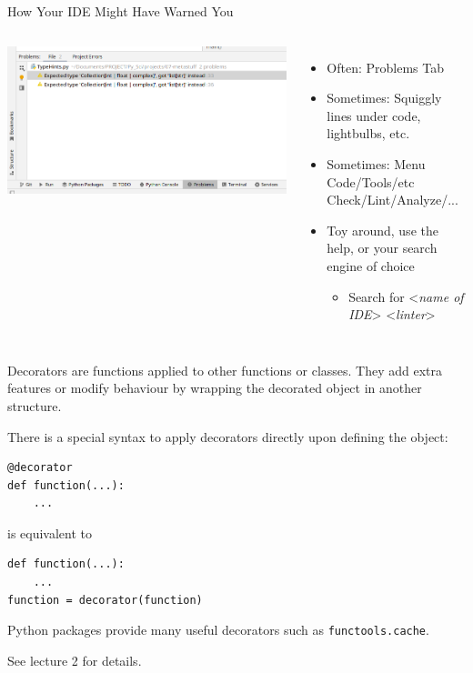 
\begin{frame}{How Your IDE Might Have Warned You}
%
\begin{columns}[T]
	\includegraphics[width=\linewidth]{./gfx/15-pycharm-linter}
%
	\begin{itemize}
	\item Often: Problems Tab
	\item Sometimes: Squiggly lines under code, lightbulbs, etc.
	\item Sometimes: Menu \thus Code/Tools/etc \thus Check/Lint/Analyze/...
	\item Toy around, use the help, or your search engine of choice
		\begin{itemize}
		\item Search for <\emph{name of IDE}> <\emph{linter}>
		\end{itemize}
	\end{itemize}
\end{columns}
%
\end{frame}


\begin{frame}[fragile]
%
\begin{recapbox}
\footnotesize
Decorators are functions applied to other functions or classes. 
They add extra features or modify behaviour by wrapping the decorated object in another structure.

\vspace*{5pt}
There is a special syntax to apply decorators directly upon defining the object:
\begin{verbatim}
@decorator
def function(...):
    ...
\end{verbatim}
is equivalent to
\begin{verbatim}
def function(...):
    ...
function = decorator(function)
\end{verbatim}

Python packages provide many useful decorators such as \texttt{functools.cache}.

See lecture 2 for details.
\end{recapbox}
%
\end{frame}

